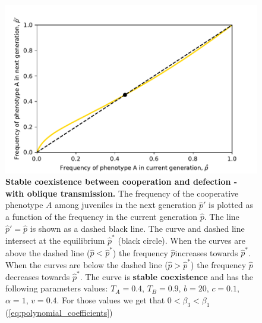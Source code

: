 \documentclass[12pt]{extarticle}
\begin{document}
{%
\begin{figure}[htb]
  \centering
  \includegraphics{coexistence_with_oblique.pdf}
  \caption{\textbf{Stable coexistence between cooperation and defection - with oblique transmission.} The frequency of the cooperative phenotype $A$ among juveniles in the next generation $\hat{p}'$ is plotted as a function of the frequency in the current generation $\hat{p}$.
  The line $\hat{p}'=\hat{p}$ is shown as a dashed black line. The curve and dashed line intersect at the equilibrium $\hat{p}^*$ (black circle).
  When the curves are above the dashed line ($\hat{p}<\hat{p}^*$) the frequency $\hat{p}$increases towards $\hat{p}^*$.
  When the curves are below the dashed line ($\hat{p}>\hat{p}^*$) the frequency $\hat{p}$ decreases towards $\hat{p}^*$.
  The curve is \textbf{stable coexistence} and has the following parameters values:  $T_A = 0.4$, $T_B = 0.9$, $b = 20$, $c=0.1$, $\alpha = 1$, $v=0.4$. For those values we get that $0<\beta_3<\beta_1$ (\autoref{eq:polynomial_coefficients})}
  \label{fig:coexistence_with_oblique}
  \end{figure}

}
\end{document}
